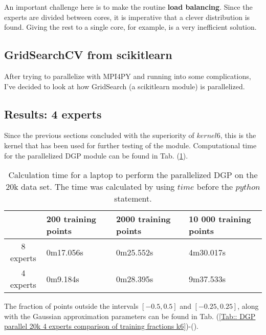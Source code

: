 \documentclass[twoside,english]{uiofysmaster}
\begin{document}
An important challenge here is to make the routine \textbf{load balancing}. Since the experts are divided between cores, it is imperative that a clever distribution is found. Giving the rest to a single core, for example, is a very inefficient solution.


\subsection{GridSearchCV from scikitlearn}

After trying to parallelize with MPI4PY and running into some complications, I've decided to look at how GridSearch (a scikitlearn module) is parallelized. 

\subsection{Results: 4 experts}

Since the previous sections concluded with the superiority of $kernel6$, this is the kernel that has been used for further testing of the module. Computational time for the parallelized DGP module can be found in Tab. (\ref{Tab:: Calc time for parallelized}).

\begin{table}
\centering
\begin{tabular}{|c|l|l|l|}
\hline
 & 200 training points & 2000 training points & 10 000 training points\\
 \hline
8 experts & 0m17.056s & 0m25.552s & 4m30.017s \\
4 experts & 0m9.184s & 0m28.395s & 9m37.533s\\
\hline
\end{tabular}
\caption{Calculation time for a laptop to perform the parallelized DGP on the 20k data set. The time was calculated by using $time$ before the $python$ statement.}
\label{Tab:: Calc time for parallelized}
\end{table}

The fraction of points outside the intervals $[-0.5, 0.5]$ and $[-0.25, 0.25]$, along with the Gaussian approximation parameters can be found in Tab. (\ref{Tab:: DGP parallel 20k 4 experts comparison of training fractions k6})-().
\end{document}
